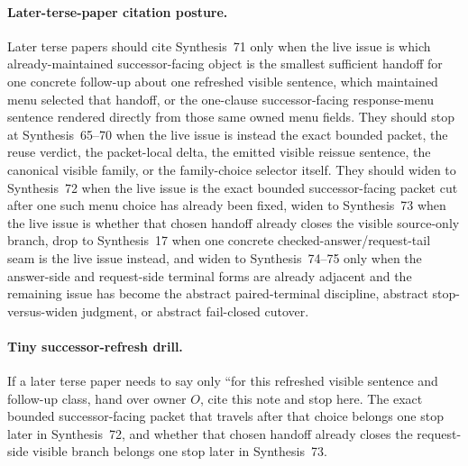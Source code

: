 \documentclass[11pt]{article}
\begin{document}
\paragraph{Later-terse-paper citation posture.}
Later terse papers should cite Synthesis~71 only when the live issue is which already-maintained successor-facing object is the smallest sufficient handoff for one concrete follow-up about one refreshed visible sentence, which maintained menu selected that handoff, or the one-clause successor-facing response-menu sentence rendered directly from those same owned menu fields. They should stop at Synthesis~65--70 when the live issue is instead the exact bounded packet, the reuse verdict, the packet-local delta, the emitted visible reissue sentence, the canonical visible family, or the family-choice selector itself. They should widen to Synthesis~72 when the live issue is the exact bounded successor-facing packet cut after one such menu choice has already been fixed, widen to Synthesis~73 when the live issue is whether that chosen handoff already closes the visible source-only branch, drop to Synthesis~17 when one concrete checked-answer/request-tail seam is the live issue instead, and widen to Synthesis~74--75 only when the answer-side and request-side terminal forms are already adjacent and the remaining issue has become the abstract paired-terminal discipline, abstract stop-versus-widen judgment, or abstract fail-closed cutover.\cite{series:publicrequestresponsepacketrefreshresponsepackets,series:publicrequestresponsepacketrefreshresponsepacketclosureverdicts,series:pairedterminalcitationdiscipline,series:pairedterminalcutoverrule,series:workedexample}

\paragraph{Tiny successor-refresh drill.}
If a later terse paper needs to say only ``for this refreshed visible sentence and follow-up class, hand over owner $O$, cite this note and stop here. The exact bounded successor-facing packet that travels after that choice belongs one stop later in Synthesis~72, and whether that chosen handoff already closes the request-side visible branch belongs one stop later in Synthesis~73.
\end{document}
